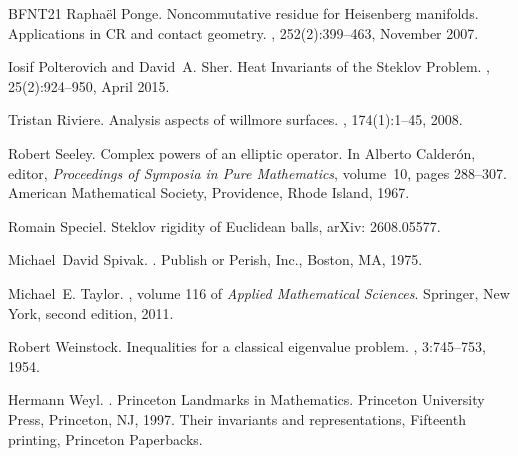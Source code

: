 \documentclass[11pt]{amsart}
\theoremstyle{definition}
\numberwithin{equation}{section}
\begin{document}
\begin{thebibliography}{BFNT21}
    Rapha{\"e}l Ponge.
    \newblock Noncommutative residue for {{Heisenberg}} manifolds. {{Applications}}
      in {{CR}} and contact geometry.
    , 252(2):399--463, November 2007.
    
    Iosif Polterovich and David~A. Sher.
    \newblock Heat {{Invariants}} of the {{Steklov Problem}}.
    , 25(2):924--950, April 2015.
    
    Tristan Riviere.
    \newblock Analysis aspects of willmore surfaces.
    , 174(1):1--45, 2008.
    
    Robert Seeley.
    \newblock Complex powers of an elliptic operator.
    \newblock In Alberto Calder{\'o}n, editor, {\em Proceedings of {{Symposia}} in
      {{Pure Mathematics}}}, volume~10, pages 288--307. American Mathematical
      Society, Providence, Rhode Island, 1967.
    
    Romain Speciel.
    \newblock Steklov rigidity of {{Euclidean}} balls, arXiv: 2608.05577.
    
    Michael~David Spivak.
    .
    \newblock Publish or Perish, Inc., Boston, MA, 1975.
    
    Michael~E. Taylor.
    , volume 116 of {\em Applied {{Mathematical Sciences}}}.
    \newblock Springer, New York, second edition, 2011.
    
    Robert Weinstock.
    \newblock Inequalities for a classical eigenvalue problem.
    , 3:745--753, 1954.
    
    Hermann Weyl.
    .
    \newblock Princeton Landmarks in Mathematics. Princeton University Press,
      Princeton, NJ, 1997.
    \newblock Their invariants and representations, Fifteenth printing, Princeton
      Paperbacks.
    

\end{thebibliography}
\end{document}
